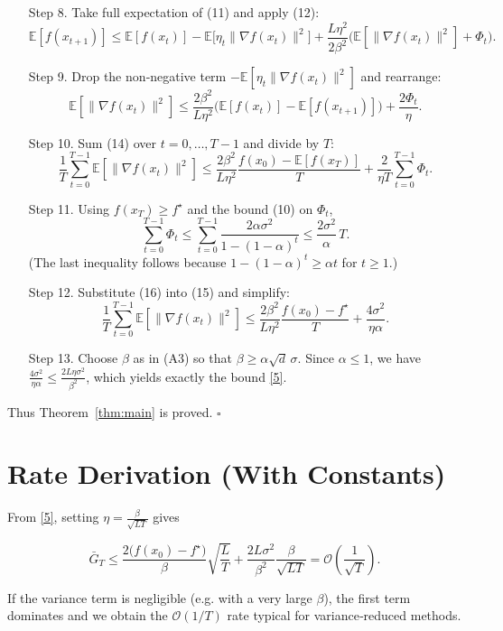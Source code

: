 \documentclass{article}
\newcommand{\E}{\mathbb{E}}
\begin{document}
\begin{enumerate}
\item[Step 8.] Take full expectation of (11) and apply (12):
\[
\E[f(x_{t+1})]\le \E[f(x_t)]
-\E\!\big[\eta_t\|\nabla f(x_t)\|^{2}\big]
+\frac{L\eta^{2}}{2\beta^{2}}\Big(\E[\|\nabla f(x_t)\|^{2}]+\Phi_t\Big).
\tag{13}
\]

\item[Step 9.] Drop the non‑negative term $-\E[\eta_t\|\nabla f(x_t)\|^{2}]$ and
rearrange:
\[
\E[\|\nabla f(x_t)\|^{2}]
\le\frac{2\beta^{2}}{L\eta^{2}}
\Big(\E[f(x_t)]-\E[f(x_{t+1})]\Big)
+\frac{2\Phi_t}{\eta}.
\tag{14}
\]

\item[Step 10.] Sum (14) over $t=0,\dots,T-1$ and divide by $T$:
\[
\frac{1}{T}\sum_{t=0}^{T-1}\E[\|\nabla f(x_t)\|^{2}]
\le\frac{2\beta^{2}}{L\eta^{2}}
\frac{f(x_0)-\E[f(x_T)]}{T}
+\frac{2}{\eta T}\sum_{t=0}^{T-1}\Phi_t .
\tag{15}
\]

\item[Step 11.] Using $f(x_T)\ge f^{\star}$ and the bound (10) on $\Phi_t$,
\[
\sum_{t=0}^{T-1}\Phi_t
\le\sum_{t=0}^{T-1}\frac{2\alpha\sigma^{2}}{1-(1-\alpha)^{t}}
\le\frac{2\sigma^{2}}{\alpha}\,T .
\tag{16}
\]
(The last inequality follows because $1-(1-\alpha)^{t}\ge\alpha t$ for
$t\ge1$.)

\item[Step 12.] Substitute (16) into (15) and simplify:
\[
\frac{1}{T}\sum_{t=0}^{T-1}\E[\|\nabla f(x_t)\|^{2}]
\le
\frac{2\beta^{2}}{L\eta^{2}}\frac{f(x_0)-f^{\star}}{T}
+\frac{4\sigma^{2}}{\eta\alpha}.
\tag{17}
\]

\item[Step 13.] Choose $\beta$ as in (A3) so that $\beta\ge\alpha\sqrt{d}\,\sigma$.
Since $\alpha\le1$, we have $\frac{4\sigma^{2}}{\eta\alpha}\le\frac{2L\eta\sigma^{2}}{\beta^{2}}$,
which yields exactly the bound \eqref{5}.
\end{enumerate}

Thus Theorem~\ref{thm:main} is proved. $\square$

\section*{Rate Derivation (With Constants)}
From \eqref{5}, setting $\eta =\frac{\beta}{\sqrt{L T}}$ gives

\[
\bar G_T\le
\frac{2\big(f(x_0)-f^{\star}\big)}{\beta}\sqrt{\frac{L}{T}}
+\frac{2L\sigma^{2}}{\beta^{2}}\frac{\beta}{\sqrt{L T}}
=
\mathcal{O}\!\left(\frac{1}{\sqrt{T}}\right).
\]

If the variance term is negligible (e.g. with a very large $\beta$), the
first term dominates and we obtain the $\mathcal{O}(1/T)$ rate typical for
variance‑reduced methods.
\end{document}
